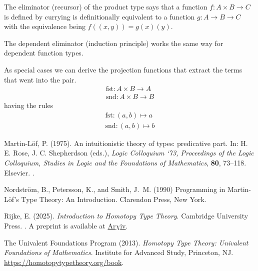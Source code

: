 \documentclass[11pt]{article}
\begin{document}
The eliminator (recursor) of the product type says that a function
$f : A \times B \to C$ is defined by currying is definitionally equivalent
to a function $g : A \to B \to C$ with the equivalence
being $f((x, y)) = g(x)(y)$.

The dependent eliminator (induction principle) works the same way for
dependent function types.

As special cases we can derive the projection functions that extract the
terms that went into the pair.
\begin{align*}
   \text{fst} : A \times B \to A
   \\
   \text{snd} : A \times B \to B
\end{align*}
having the rules
\begin{align*}
   \text{fst} : (a, b) \mapsto a
   \\
   \text{snd} : (a, b) \mapsto b
\end{align*}

\begin{thebibliography}{}

Martin-L\"{o}f, P. (1975).
\newblock An intuitionistic theory of types: predicative part.
\newblock In: H. E. Rose, J. C. Shepherdson (eds.),
    \emph{Logic Colloquium ‘73, Proceedings of the Logic Colloquium,
    Studies in Logic and the Foundations of Mathematics}, \textbf{80}, 73--118.
\newblock Elsevier.
\newblock {}.

Nordstr\"{o}m, B., Petersson, K., and Smith, J.~M. (1990)
\newblock Programming in Martin-L\"{o}f's Type Theory: An Introduction.
\newblock Clarendon Press, New York.

Rijke, E. (2025).
\newblock \emph{Introduction to Homotopy Type Theory}.
\newblock Cambridge University Press.
\newblock {}.
\newblock A preprint is available at
    \href{https://arxiv.org/abs/2212.11082}{Ar$\chi$iv}.

The Univalent Foundations Program (2013).
\newblock \emph{Homotopy Type Theory: Univalent Foundations of Mathematics}.
\newblock Institute for Advanced Study, Princeton, NJ.
\newblock \url{https://homotopytypetheory.org/book}.

\end{thebibliography}
\end{document}
